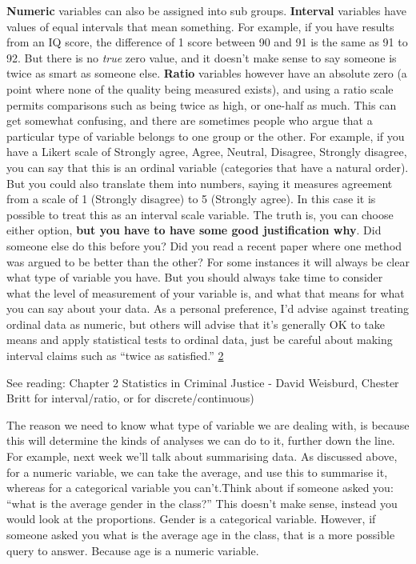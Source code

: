 \documentclass[]{book}
\theoremstyle{definition}
\theoremstyle{definition}
\theoremstyle{definition}
\theoremstyle{remark}
\begin{document}
\textbf{Numeric} variables can also be assigned into sub groups.
\textbf{Interval} variables have values of equal intervals that mean
something. For example, if you have results from an IQ score, the
difference of 1 score between 90 and 91 is the same as 91 to 92. But
there is no \emph{true} zero value, and it doesn't make sense to say
someone is twice as smart as someone else. \textbf{Ratio} variables
however have an absolute zero (a point where none of the quality being
measured exists), and using a ratio scale permits comparisons such as
being twice as high, or one-half as much. This can get somewhat
confusing, and there are sometimes people who argue that a particular
type of variable belongs to one group or the other. For example, if you
have a Likert scale of Strongly agree, Agree, Neutral, Disagree,
Strongly disagree, you can say that this is an ordinal variable
(categories that have a natural order). But you could also translate
them into numbers, saying it measures agreement from a scale of 1
(Strongly disagree) to 5 (Strongly agree). In this case it is possible
to treat this as an interval scale variable. The truth is, you can
choose either option, \textbf{but you have to have some good
justification why}. Did someone else do this before you? Did you read a
recent paper where one method was argued to be better than the other?
For some instances it will always be clear what type of variable you
have. But you should always take time to consider what the level of
measurement of your variable is, and what that means for what you can
say about your data. As a personal preference, I'd advise against
treating ordinal data as numeric, but others will advise that it's
generally OK to take means and apply statistical tests to ordinal data,
just be careful about making interval claims such as ``twice as
satisfied.'' \href{http://www.usablestats.com/lessons/noir}{2}

See reading: Chapter 2 Statistics in Criminal Justice - David Weisburd,
Chester Britt for interval/ratio, or for discrete/continuous)

The reason we need to know what type of variable we are dealing with, is
because this will determine the kinds of analyses we can do to it,
further down the line. For example, next week we'll talk about
summarising data. As discussed above, for a numeric variable, we can
take the average, and use this to summarise it, whereas for a
categorical variable you can't.Think about if someone asked you: ``what
is the average gender in the class?'' This doesn't make sense, instead
you would look at the proportions. Gender is a categorical variable.
However, if someone asked you what is the average age in the class, that
is a more possible query to answer. Because age is a numeric variable.
\end{document}
